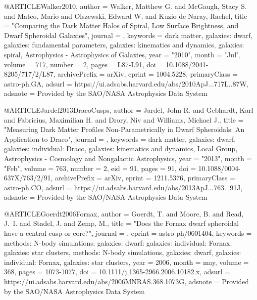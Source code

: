 \documentclass[apj]{emulateapj}
\begin{document}
{{{{@ARTICLE{Walker2010,
       author = {{Walker}, Matthew G. and {McGaugh}, Stacy S. and {Mateo}, Mario and
         {Olszewski}, Edward W. and {Kuzio de Naray}, Rachel},
        title = "{Comparing the Dark Matter Halos of Spiral, Low Surface Brightness, and Dwarf Spheroidal Galaxies}",
      journal = {\apj},
     keywords = {dark matter, galaxies: dwarf, galaxies: fundamental parameters, galaxies: kinematics and dynamics, galaxies: spiral, Astrophysics - Astrophysics of Galaxies},
         year = "2010",
        month = "Jul",
       volume = {717},
       number = {2},
        pages = {L87-L91},
          doi = {10.1088/2041-8205/717/2/L87},
archivePrefix = {arXiv},
       eprint = {1004.5228},
 primaryClass = {astro-ph.GA},
       adsurl = {https://ui.adsabs.harvard.edu/abs/2010ApJ...717L..87W},
      adsnote = {Provided by the SAO/NASA Astrophysics Data System}
}



@ARTICLE{Jardel2013DracoCusps,
       author = {{Jardel}, John R. and {Gebhardt}, Karl and {Fabricius}, Maximilian H. and
         {Drory}, Niv and {Williams}, Michael J.},
        title = "{Measuring Dark Matter Profiles Non-Parametrically in Dwarf Spheroidals: An Application to Draco}",
      journal = {\apj},
     keywords = {dark matter, galaxies: dwarf, galaxies: individual: Draco, galaxies: kinematics and dynamics, Local Group, Astrophysics - Cosmology and Nongalactic Astrophysics},
         year = "2013",
        month = "Feb",
       volume = {763},
       number = {2},
          eid = {91},
        pages = {91},
          doi = {10.1088/0004-637X/763/2/91},
archivePrefix = {arXiv},
       eprint = {1211.5376},
 primaryClass = {astro-ph.CO},
       adsurl = {https://ui.adsabs.harvard.edu/abs/2013ApJ...763...91J},
      adsnote = {Provided by the SAO/NASA Astrophysics Data System}
}



@ARTICLE{Goerdt2006Fornax,
   author = {{Goerdt}, T. and {Moore}, B. and {Read}, J.~I. and {Stadel}, J. and 
	{Zemp}, M.},
    title = "{Does the Fornax dwarf spheroidal have a central cusp or core?}",
  journal = {\mnras},
   eprint = {astro-ph/0601404},
 keywords = {methods: N-body simulations: galaxies: dwarf: galaxies: individual: Fornax: galaxies: star clusters, methods: N-body simulations, galaxies: dwarf, galaxies: individual: Fornax, galaxies: star clusters},
     year = 2006,
    month = may,
   volume = 368,
    pages = {1073-1077},
      doi = {10.1111/j.1365-2966.2006.10182.x},
   adsurl = {https://ui.adsabs.harvard.edu/abs/2006MNRAS.368.1073G},
  adsnote = {Provided by the SAO/NASA Astrophysics Data System}
}


}}}}
\end{document}
